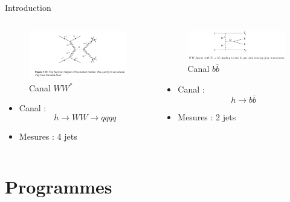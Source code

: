 \documentclass[9pt]{beamer}
\newcommand{\bbar}{\overline{b}}
\begin{document}
\begin{frame}{Introduction}
\begin{columns}
\begin{column}{0.3\textwidth}
			\begin{figure}
				\centering
				\includegraphics[width=\textwidth]{../img/nnh_WW.png} 
				\caption{Canal $WW^{*}$}
			\end{figure}
			\begin{itemize}
				\item Canal : $$h \longrightarrow WW \longrightarrow qqqq$$
				\item Mesures : 4 jets
			\end{itemize}
		\end{column}
		
		\begin{column}{0.3\textwidth}
			\begin{figure}
				\centering
				\includegraphics[width=\textwidth]{../img/nnh_bb.png} 
				\caption{Canal $b\overline{b}$}
			\end{figure}
			\begin{itemize}
				\item Canal : $$h \longrightarrow b\bbar$$
				\item Mesures : 2 jets
			\end{itemize}		
		\end{column}
	\end{columns}
    
\end{frame}

\section{Programmes}
\end{document}
